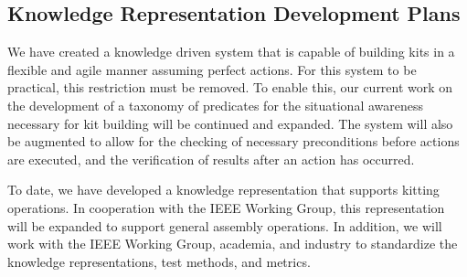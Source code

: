 \subsection{Knowledge Representation Development Plans}
We have created a knowledge driven system that is capable of building
kits in a flexible and agile manner assuming perfect actions. For this system
to be practical, this restriction must be removed. 
To enable this, our current work on the development of a taxonomy of
predicates for the situational awareness necessary for kit building will
be continued and expanded. The system will also be augmented to
allow for the checking of necessary preconditions before actions are
executed, and the verification of results after an action has occurred.

To date, we have developed a knowledge representation that supports
kitting operations. In cooperation with the IEEE Working Group, this
representation will be expanded to support general assembly operations.
In addition, we will work with the IEEE Working Group, academia, and 
industry to standardize the knowledge representations, test methods,
and metrics.